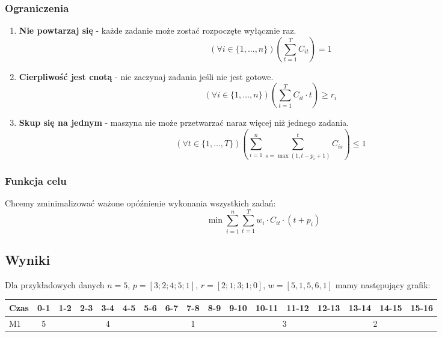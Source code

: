 \documentclass{article}
\theoremstyle{definition}
\theoremstyle{remark}
\theoremstyle{plain}
\theoremstyle{remark}
\theoremstyle{plain}
\begin{document}
\subsubsection{Ograniczenia}
\begin{enumerate}
    \item \textbf{Nie powtarzaj się} - każde zadanie może zostać rozpoczęte wyłącznie raz.
    \[ (\forall i \in \{1,\dots,n\}) \left(\sum_{t=1}^{T}{C_{it}} \right) = 1 \]
    \item \textbf{Cierpliwość jest cnotą} - nie zaczynaj zadania jeśli nie jest gotowe.
    \[ (\forall i \in \{1,\dots,n\}) \left(\sum_{t=1}^{T}{C_{it}\cdot t} \right) \geq r_i \]
    \item \textbf{Skup się na jednym} - maszyna nie może przetwarzać naraz więcej niż jednego zadania.
    \[ (\forall t \in \{1,\dots,T\}) \left(\sum_{i=1}^{n}{\sum_{s=\max(1,t-p_i+1)}^{t}{C_{is}}} \right) \leq 1 \]
\end{enumerate}

\subsubsection{Funkcja celu}
Chcemy zminimalizować ważone opóźnienie wykonania wszystkich zadań:
\[ \min \sum_{i=1}^n{\sum_{t=1}^T{w_i\cdot C_{it}\cdot (t+p_i)}} \]

\subsection{Wyniki}
Dla przykładowych danych $n=5$, $p=[3;2;4;5;1]$, $r=[2;1;3;1;0]$, $w=[5,1,5,6,1]$ mamy następujący grafik:

\begin{table}[H]
\centering
\begin{tabular}{|l|cccccccccccccccc}
\hline
Czas & \multicolumn{1}{c|}{0-1}  & \multicolumn{1}{c|}{1-2} & \multicolumn{1}{c|}{2-3} & \multicolumn{1}{c|}{3-4} & \multicolumn{1}{c|}{4-5} & \multicolumn{1}{c|}{5-6} & \multicolumn{1}{c|}{6-7} & \multicolumn{1}{c|}{7-8} & \multicolumn{1}{c|}{8-9} & \multicolumn{1}{c|}{9-10} & \multicolumn{1}{c|}{10-11} & \multicolumn{1}{c|}{11-12} & \multicolumn{1}{c|}{12-13} & \multicolumn{1}{c|}{13-14} & \multicolumn{1}{c|}{14-15} & \multicolumn{1}{c|}{15-16} \\ \hline
M1   & \cellcolor[HTML]{9698ED}5 & \multicolumn{5}{c}{\cellcolor[HTML]{DAE8FC}4}                                                                                        & \multicolumn{3}{c}{\cellcolor[HTML]{FD6864}1}                                  & \multicolumn{4}{c}{\cellcolor[HTML]{67FD9A}3}                                                                    & \multicolumn{2}{c}{\cellcolor[HTML]{FFFE65}2}           &                            \\ \cline{1-1}
\end{tabular}
\end{table}
\end{document}
